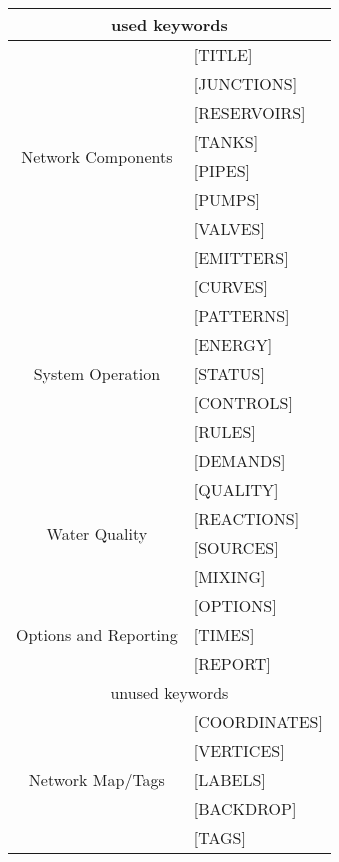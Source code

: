     \begin{tabular}{|c| l|}
	\hline
	  \multicolumn{2}{|c|}{used keywords} \\
	\hline
	\multirow{8}{*}{Network Components}
	& [TITLE]      \\
	& [JUNCTIONS]  \\
	& [RESERVOIRS] \\
	& [TANKS]      \\
	& [PIPES]      \\
	& [PUMPS]      \\
	& [VALVES]     \\
	& [EMITTERS]   \\
	\hline
	\multirow{7}{*}{System Operation}
	& [CURVES]   \\
	& [PATTERNS] \\
	& [ENERGY]   \\
	& [STATUS]   \\
	& [CONTROLS] \\
	& [RULES]    \\
	& [DEMANDS]  \\
	\hline
	\multirow{4}{*}{Water Quality}
	& [QUALITY]   \\
	& [REACTIONS] \\
	& [SOURCES]   \\
	& [MIXING]    \\
	\hline
	\multirow{3}{*}{Options and Reporting}
	& [OPTIONS]\\
	& [TIMES]  \\
	& [REPORT] \\
	\hline
	  \multicolumn{2}{|c|}{unused keywords} \\
	\hline
	
	\multirow{5}{*}{Network Map/Tags}
	& [COORDINATES]\\
	& [VERTICES]   \\
	& [LABELS]     \\
	& [BACKDROP]   \\
	& [TAGS]       \\
	\hline
  \end{tabular}

